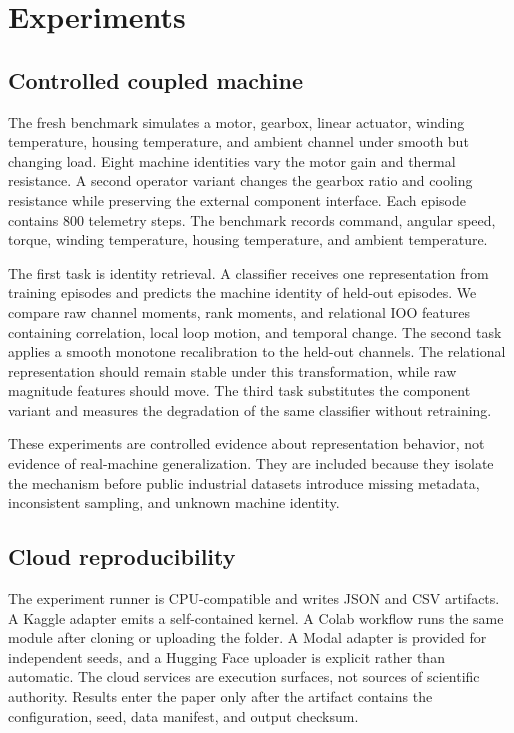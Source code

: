 \documentclass[11pt]{article}
\begin{document}
\section{Experiments}

\subsection{Controlled coupled machine}

The fresh benchmark simulates a motor, gearbox, linear actuator, winding temperature, housing temperature, and ambient channel under smooth but changing load. Eight machine identities vary the motor gain and thermal resistance. A second operator variant changes the gearbox ratio and cooling resistance while preserving the external component interface. Each episode contains 800 telemetry steps. The benchmark records command, angular speed, torque, winding temperature, housing temperature, and ambient temperature.

The first task is identity retrieval. A classifier receives one representation from training episodes and predicts the machine identity of held-out episodes. We compare raw channel moments, rank moments, and relational IOO features containing correlation, local loop motion, and temporal change. The second task applies a smooth monotone recalibration to the held-out channels. The relational representation should remain stable under this transformation, while raw magnitude features should move. The third task substitutes the component variant and measures the degradation of the same classifier without retraining.

These experiments are controlled evidence about representation behavior, not evidence of real-machine generalization. They are included because they isolate the mechanism before public industrial datasets introduce missing metadata, inconsistent sampling, and unknown machine identity.

\subsection{Cloud reproducibility}

The experiment runner is CPU-compatible and writes JSON and CSV artifacts. A Kaggle adapter emits a self-contained kernel. A Colab workflow runs the same module after cloning or uploading the folder. A Modal adapter is provided for independent seeds, and a Hugging Face uploader is explicit rather than automatic. The cloud services are execution surfaces, not sources of scientific authority. Results enter the paper only after the artifact contains the configuration, seed, data manifest, and output checksum.
\end{document}
